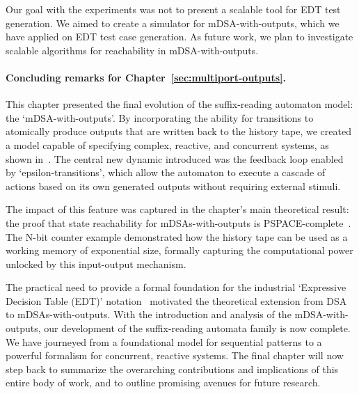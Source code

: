 Our goal with the experiments was not to present a scalable tool for EDT test generation. We aimed to create a simulator for mDSA-with-outputs, which we have applied on EDT test case generation. As future work, we plan to investigate scalable algorithms for reachability in mDSA-with-outputs.



\vspace{.25cm}


\paragraph*{Concluding remarks for Chapter~\ref{sec:multiport-outputs}.}This chapter presented the final evolution of the suffix-reading automaton model: the `mDSA-with-outputs'. By incorporating the ability for transitions to atomically produce outputs that are written back to the history tape, we created a model capable of specifying complex, reactive, and concurrent systems, as shown in~\cite{Keerthan2025netys}. The central new dynamic introduced was the feedback loop enabled by `epsilon-transitions', which allow the automaton to execute a cascade of actions based on its own generated outputs without requiring external stimuli.

The impact of this feature was captured in the chapter's main theoretical result: the proof that state reachability for mDSAs-with-outputs is PSPACE-complete~\cite{Keerthan2025netys}. The N-bit counter example demonstrated how the history tape can be used as a working memory of exponential size, formally capturing the computational power unlocked by this input-output mechanism.

The practical need to provide a formal foundation for the industrial `Expressive Decision Table (EDT)' notation~\cite{DBLP:conf/date/VenkateshSKA14} motivated the theoretical extension from DSA to mDSAs-with-outputs. With the introduction and analysis of the mDSA-with-outputs, our development of the suffix-reading automata family is now complete. We have journeyed from a foundational model for sequential patterns to a powerful formalism for concurrent, reactive systems. The final chapter will now step back to summarize the overarching contributions and implications of this entire body of work, and to outline promising avenues for future research.